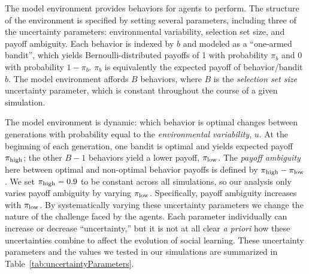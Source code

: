 \documentclass[letterpaper,11.5pt]{scrartcl}
\begin{document}
The model environment provides behaviors for agents to perform. The structure
of the environment is specified by setting several parameters, including
three of the uncertainty parameters: environmental variability, selection set size, 
and payoff ambiguity. 
Each behavior is indexed by $b$ and modeled as a ``one-armed bandit'', which yields 
Bernoulli-distributed payoffs of 1 with probability $\pi_b$ and 0 with 
probability $1 - \pi_b$. $\pi_b$ is equivalently the expected
payoff of behavior/bandit $b$. The model environment affords $B$ behaviors, where
$B$ is the \emph{selection set size} uncertainty parameter, which
is constant throughout the course of a given simulation. 

The model environment is dynamic: which behavior is optimal changes between
generations with probability equal to the \emph{environmental variability}, $u$.
At the beginning of each generation, one bandit is optimal and yields expected
payoff $\pi_{\mathrm{high}}$; the other $B-1$ behaviors yield a lower payoff, $\pi_{\mathrm{low}}$. 
The \emph{payoff ambiguity} here between optimal and non-optimal behavior
payoffs is defined by $\pi_{\mathrm{high}} - \pi_{\mathrm{low}}$. We set $\pi_{\mathrm{high}} = 0.9$ to be constant
across all simulations, so our analysis only varies payoff ambiguity by varying
$\pi_{\mathrm{low}}$. Specifically, payoff ambiguity increases with $\pi_{\mathrm{low}}$. 
By systematically varying these uncertainty parameters we change
the nature of the challenge faced by the agents. Each parameter individually 
can increase or decrease ``uncertainty,'' but it is not at all clear \emph{a priori}
how these uncertainties combine to affect the evolution of social learning.
These uncertainty parameters and the values we tested in our simulations
are summarized in Table~\ref{tab:uncertaintyParameters}.
\end{document}
